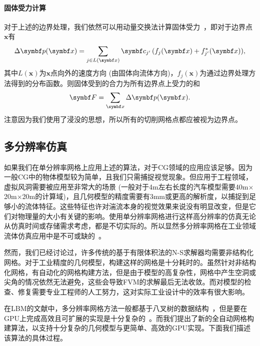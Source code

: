 \paragraph{固体受力计算}
对于上述的边界处理，我们依然可以用动量交换法计算固体受力~\cite{Ladd-1994, Mei-2002}，即对于边界点$\bm{x}$有
\begin{equation}
    \Delta \bm{p}(\bm{x})= \sum_{j\in L(\bm{x})} \bm{c}_{j'}\,(f_{j}(\bm{x}) + f^*_{j'}(\bm{x})),\vspace*{-1.5mm}
\end{equation}
其中$L(\bm{x})$为$\bm{x}$点向外的速度方向 (由固体向流体方向)，$f_{j}(\bm{x})$为通过边界处理方法得到的分布函数。则固体受到的合力为所有边界点上受力的和
\begin{equation}
    \bm{F} = \sum_{\bm{x}} \Delta \bm{p}(\bm{x}).\vspace*{-1mm}
\end{equation}
注意因为我们使用了浸没的思想，所以所有的切削网格点都应被视为边界点。

\subsection{多分辨率仿真}
\label{sec:multi-res}
如果我们在单分辨率网格上应用上述的算法，对于CG领域的应用应该足够。因为一般CG中的物体模型较为简单，且我们只需捕捉视觉现象。但应用于工程领域，虚拟风洞需要被应用至非常大的场景 (一般对于4m左右长度的汽车模型需要40m$\times$20m$\times$20m的计算域)，且几何模型的精度需要有3mm或更高的解析度，以捕捉到足够小的流体特征。这些特征也许对湍流本身的视觉效果来说没有明显改变，但是它们对物理量的大小有关键的影响。使用单分辨率网格进行这样高分辨率的仿真无论从仿真时间或存储需求考虑，都是不切实际的。所以显然多分辨率网格在工业领域流体仿真应用中是不可或缺的~\cite{Hou-2019,Aultman-2022,Romani-2022}。

然而，我们已经讨论过，许多传统的基于有限体积法的N-S求解器均需要非结构化网格。对于工业精度的几何模型，构建这样的网格是十分耗时的。虽然针对非结构化网格，有自动化的网格构建方法，但是由于模型的高复杂性，网格中产生空洞或尖角的情况依然无法避免，这些会导致FVM的求解最后无法收敛。而对模型的检查、修复需要专业工程师的人工努力，这对实际工业设计中的效率有很大影响。

在LBM的文献中，多分辨率网格方法一般都基于八叉树的数据结构~\cite{EitelAmor-2013,Hasert-2014}，但是要在GPU上完成高效且可扩展的实现是十分复杂的~\cite{Schornbaum-2016, Schornbaum-2018}。而我们提出了新的全自动网格构建算法，以支持十分复杂的几何模型与更简单、高效的GPU实现。下面我们描述该算法的具体过程。

